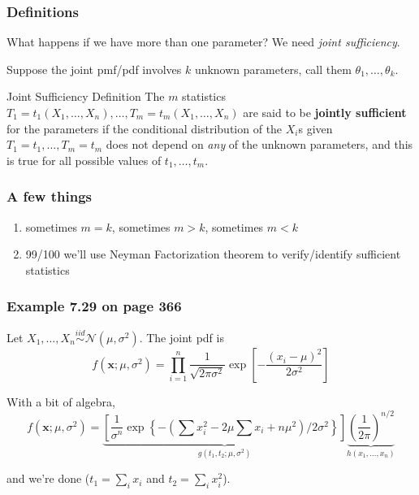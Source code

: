 \documentclass{beamer}
\begin{document}
\begin{frame}
\frametitle{Definitions}

What happens if we have more than one parameter? We need \emph{joint sufficiency}. 
\newline
\pause

Suppose the joint pmf/pdf involves $k$ unknown parameters, call them $\theta_1, \ldots, \theta_k$. 
\begin{block}{Joint Sufficiency Definition}
The $m$ statistics $T_1 = t_1(X_1, \ldots, X_n), \ldots, T_m = t_m(X_1, \ldots, X_n)$ are said to be \textbf{jointly sufficient} for the parameters if the conditional distribution of the $X_i$s given $T_1 = t_1, \ldots, T_m = t_m$ does not depend on \emph{any} of the unknown parameters, and this is true for all possible values of $t_1, \ldots, t_m$.
\end{block}


\end{frame}

\begin{frame}
\frametitle{A few things}

\begin{enumerate}
\item sometimes $m = k$, sometimes $m > k$, sometimes $m < k$
\item 99/100 we'll use Neyman Factorization theorem to verify/identify sufficient statistics
\end{enumerate}

\end{frame}


\begin{frame}
\frametitle{Example 7.29 on page 366}

Let $X_1, \ldots, X_n \overset{iid}{\sim} \mathcal{N}(\mu, \sigma^2)$. The joint pdf is 
\[
f(\mathbf{x} ; \mu, \sigma^2) = \prod_{i=1}^n \frac{1}{\sqrt{2 \pi \sigma^2}} \exp \left[ - \frac{ (x_i - \mu)^2}{2 \sigma^2} \right]
\]

With a bit of algebra, 
\[
f(\mathbf{x} ; \mu, \sigma^2) = \underbrace{\left[ \frac{1}{\sigma^n} \exp\left\{- \left(\sum x_i^2 - 2\mu\sum x_i + n \mu^2 \right) / 2\sigma^2 \right\} \right]}_{g(t_1, t_2;\mu, \sigma^2)} \underbrace{\left( \frac{1}{2 \pi} \right)^{n/2}}_{h(x_1,\ldots,x_n)}
\]

and we're done ($t_1 = \sum_i x_i$ and $t_2 = \sum_i x_i^2$).
\end{frame}
\end{document}
